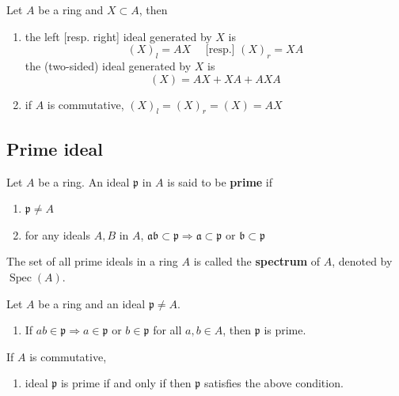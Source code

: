 \begin{proposition}
    Let $A$ be a ring and $X \subset A$,
    then
    \begin{enumerate}
        \item
              the left [resp. right] ideal generated by $X$ is
              \begin{equation*}
                  \left(X\right)_l
                  =
                  AX
                  \quad  \text{  [resp.] }
                  \left(X\right)_r= XA
              \end{equation*}
              the (two-sided) ideal generated by $X$ is
              \begin{equation*}
                  \left(X\right)
                  =
                  AX+XA +AXA
              \end{equation*}
        \item
              if $A$ is commutative, $\left(X\right)_l=\left(X\right)_r=\left(X\right)=AX$
    \end{enumerate}
\end{proposition}





\subsection{Prime ideal} %
\begin{definition}
    Let $A$ be a ring.
    An ideal $\mathfrak{p}$ in $A$ is said to be \textbf{prime} if
    \begin{enumerate}[label=(\roman*)]
        \item
              $\mathfrak{p} \neq {A}$
        \item
              for any ideals $A, B$ in $A$,
              $\mathfrak{a} \mathfrak{b} \subset \mathfrak{p}\Rightarrow \mathfrak{a} \subset\mathfrak{p} \text { or } \mathfrak{b} \subset \mathfrak{p}$
    \end{enumerate}
    The set of all prime ideals in a ring $A$ is called the \textbf{spectrum} of $A$, denoted by $\operatorname{Spec}(A)$.
\end{definition}

\begin{theorem}
    \label{thm: Prime ideal}
    Let $A$ be a ring and an ideal $\mathfrak{p} \neq A$.
    \begin{enumerate}
        \item
              If $a b \in \mathfrak{p} \Rightarrow a \in \mathfrak{p}\text { or  } b \in \mathfrak{p}$ for all $a,b\in A$, then $\mathfrak{p}$ is prime.
    \end{enumerate}
    If $A$ is commutative,
    \begin{enumerate}[resume]
        \item ideal $\mathfrak{p}$ is prime if and only if then $\mathfrak{p}$ satisfies the above condition.
    \end{enumerate}
\end{theorem}

